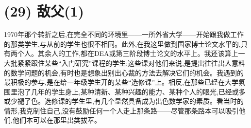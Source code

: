 
\section{(29) 敌父(1)}

1970年那个转折之后,在完全不同的环境里——一所外省大学——开始跟我做工作的那类学生,与从前的学生也很不相同。此外,在我这里做到国家博士论文水平的,只有两个人。其余人的工作,都在DEA或第三阶段博士论文的水平上。我还该算上一大批紧紧跟住某些“入门研究”课程的学生:这些课对他们来说,是提出往往出人意料的数学问题的机会,有时也是想象出别出心裁的方法去解决它们的机会。我遇到的最积极的参与,是在给一年级学生开的某些“选修课”上。相反,在那些已经在大学氛围里泡了几年的学生身上,某种清新、某种兴趣的能力、某种个人的眼光,已经或多或少褪了色。选修课的学生里,有几个显然具备成为出色数学家的素质。看当时的情形,我克制住自己,没有鼓励任何一个人走上那条路——尽管那条路本可以吸引他们,他们本可以在那里出类拔萃。

